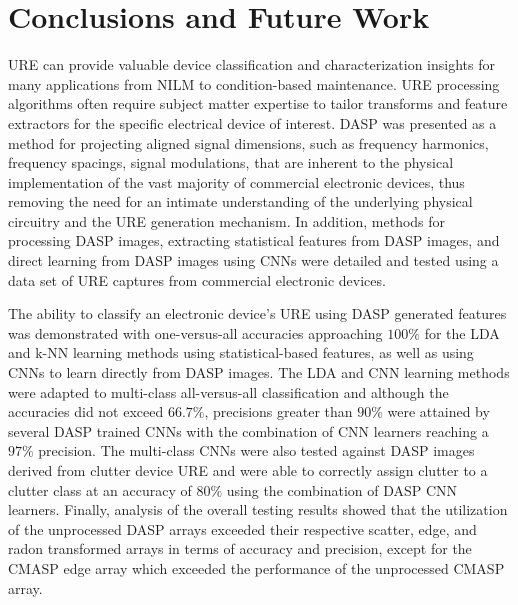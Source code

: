 
\chapter{Conclusions and Future Work}
\label{Conclusions and Future Work}

URE can provide valuable device classification and characterization insights for many applications from NILM to condition-based maintenance. URE processing algorithms often require subject matter expertise to tailor transforms and feature extractors for the specific electrical device of interest.  DASP was presented as a method for projecting aligned signal dimensions, such as frequency harmonics, frequency spacings, signal modulations, that are inherent to the physical implementation of the vast majority of commercial electronic devices, thus removing the need for an intimate understanding of the underlying physical circuitry and the URE generation mechanism. In addition, methods for processing DASP images, extracting statistical features from DASP images, and direct learning from DASP images using CNNs were detailed and tested using a data set of URE captures from commercial electronic devices.

The ability to classify an electronic device's URE using DASP generated features was demonstrated with one-versus-all accuracies approaching $100\%$ for the LDA and k-NN learning methods using statistical-based features, as well as using CNNs to learn directly from DASP images.  The LDA and CNN learning methods were adapted to multi-class all-versus-all classification and although the accuracies did not exceed $66.7\%$, precisions greater than $90\%$ were attained by several DASP trained CNNs with the combination of CNN learners reaching  a $97\%$ precision.  The multi-class CNNs were also tested against DASP images derived from clutter device URE and were able to correctly assign clutter to a clutter class at an accuracy of $80\%$ using the combination of DASP CNN learners.  Finally, analysis of the overall testing results showed that the utilization of the unprocessed DASP arrays exceeded their respective scatter, edge, and radon transformed arrays in terms of accuracy and precision, except for the CMASP edge array which exceeded the performance of the unprocessed CMASP array.


